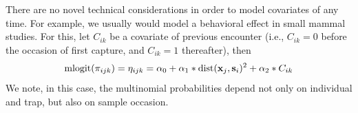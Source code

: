 There are no novel technical considerations in order to model
covariates of any time. 
For example, we usually would model a behavioral
effect in small mammal studies. For this, let
$C_{ik}$ be a covariate of previous encounter
(i.e., $C_{ik} = 0$ before the occasion of first capture, and $C_{ik}
= 1$ thereafter), then
\[
\mbox{mlogit}(\pi_{ijk}) = \eta_{ijk} = \alpha_{0}  +\alpha_{1}*\mbox{dist}({\bf  x}_{j},{\bf s}_{i})^2 +  \alpha_{2}*C_{ik}
\]
We note, in this case, the multinomial probabilities depend not only
on individual and trap, but also on sample occasion.

